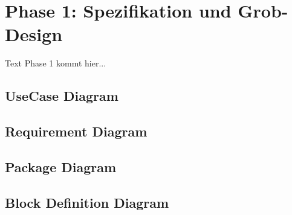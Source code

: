 \chapter{Phase 1: Spezifikation und Grob-Design}

Text Phase 1 kommt hier...
\section{UseCase Diagram}

\section{Requirement Diagram}

\section{Package Diagram}

\section{Block Definition Diagram}